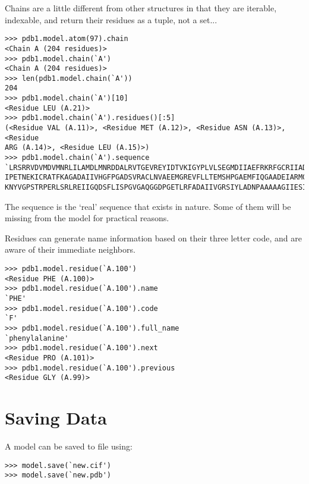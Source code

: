 Chains are a little different from other structures in that they are iterable,
indexable, and return their residues as a tuple, not a set...

\begin{footnotesize}
\begin{verbatim}
>>> pdb1.model.atom(97).chain
<Chain A (204 residues)>
>>> pdb1.model.chain(`A')
<Chain A (204 residues)>
>>> len(pdb1.model.chain(`A'))
204
>>> pdb1.model.chain(`A')[10]
<Residue LEU (A.21)>
>>> pdb1.model.chain(`A').residues()[:5]
(<Residue VAL (A.11)>, <Residue MET (A.12)>, <Residue ASN (A.13)>, <Residue
ARG (A.14)>, <Residue LEU (A.15)>)
>>> pdb1.model.chain(`A').sequence
`LRSRRVDVMDVMNRLILAMDLMNRDDALRVTGEVREYIDTVKIGYPLVLSEGMDIIAEFRKRFGCRIIADFKVAD
IPETNEKICRATFKAGADAIIVHGFPGADSVRACLNVAEEMGREVFLLTEMSHPGAEMFIQGAADEIARMGVDLGV
KNYVGPSTRPERLSRLREIIGQDSFLISPGVGAQGGDPGETLRFADAIIVGRSIYLADNPAAAAAGIIESIKDLLI'
\end{verbatim}
\end{footnotesize}

The sequence is
the `real' sequence that exists in nature. Some of them will be
missing from the model for practical reasons.

Residues can generate name information based on their three letter code, and are
aware of their immediate neighbors.

\begin{footnotesize}
\begin{verbatim}
>>> pdb1.model.residue(`A.100')
<Residue PHE (A.100)>
>>> pdb1.model.residue(`A.100').name
`PHE'
>>> pdb1.model.residue(`A.100').code
`F'
>>> pdb1.model.residue(`A.100').full_name
`phenylalanine'
>>> pdb1.model.residue(`A.100').next
<Residue PRO (A.101)>
>>> pdb1.model.residue(`A.100').previous
<Residue GLY (A.99)>
\end{verbatim}
\end{footnotesize}

\section{Saving Data}

A model can be saved to file using:

\begin{footnotesize}
\begin{verbatim}
>>> model.save(`new.cif')
>>> model.save(`new.pdb')
\end{verbatim}
\end{footnotesize}

